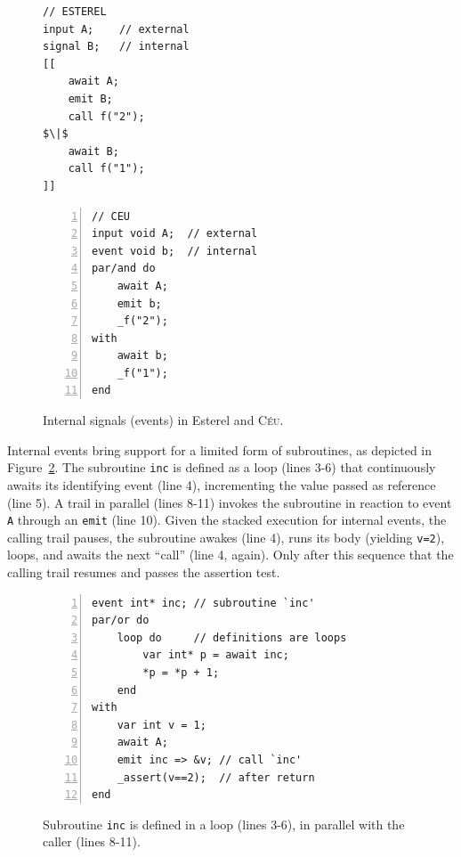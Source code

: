 \documentclass{acm_proc_article-sp}
\newcommand{\CEU}{\textsc{C\'{e}u}\xspace}
\newcommand{\code}[1] {{\small{\texttt{#1}}}}
\newcommand{\1}{\;}
\newcommand{\2}{\;\;}
\newcommand{\3}{\;\;\;}
\newcommand{\5}{\;\;\;\;\;}
\begin{document}
\begin{figure}[!t]
\begin{minipage}[t]{0.43\linewidth}
\begin{lstlisting}[mathescape=true]
// ESTEREL
input A;    // external
signal B;   // internal
[[
    await A;
    emit B;
    call f("2");
$\|$
    await B;
    call f("1");
]]
\end{lstlisting}
\end{minipage}
%
\begin{minipage}[t]{0.56\linewidth}
\begin{lstlisting}[numbers=left,xleftmargin=3.1em]
// CEU
input void A;  // external
event void b;  // internal
par/and do
    await A;
    emit b;
    _f("2");
with
    await b;
    _f("1");
end
\end{lstlisting}
\end{minipage}
\caption{ Internal signals (events) in Esterel and \CEU. \newline
\label{lst.prints}
}
\end{figure}

Internal events bring support for a limited form of subroutines, as depicted in 
Figure~\ref{lst.sub}.
The subroutine \code{inc} is defined as a loop (lines 3-6) that continuously 
awaits its identifying event (line 4), incrementing the value passed as 
reference (line 5).
A trail in parallel (lines 8-11) invokes the subroutine in reaction to event 
\code{A} through an \code{emit} (line 10).
Given the stacked execution for internal events, the calling trail pauses, the 
subroutine awakes (line 4), runs its body (yielding \code{v=2}), loops, and 
awaits the next ``call'' (line 4, again).
Only after this sequence that the calling trail resumes and passes the 
assertion test.
 
\begin{figure}
\begin{lstlisting}[numbers=left,xleftmargin=2em]
event int* inc; // subroutine `inc'
par/or do
    loop do     // definitions are loops
        var int* p = await inc;
        *p = *p + 1;
    end
with
    var int v = 1;
    await A;
    emit inc => &v; // call `inc'
    _assert(v==2);  // after return
end
\end{lstlisting}
\caption{ Subroutine \code{inc} is defined in a loop (lines 3-6), in parallel 
with the caller (lines 8-11).
\label{lst.sub}
}
\end{figure}
\end{document}
